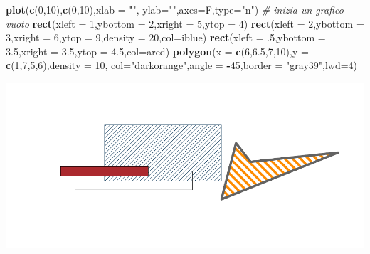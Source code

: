 \documentclass[
  11pt,
]{book}
\newenvironment{Shaded}{\begin{snugshade}}{\end{snugshade}}
\newcommand{\AttributeTok}[1]{\textcolor[rgb]{0.13,0.29,0.53}{#1}}
\newcommand{\CommentTok}[1]{\textcolor[rgb]{0.56,0.35,0.01}{\textit{#1}}}
\newcommand{\DecValTok}[1]{\textcolor[rgb]{0.00,0.00,0.81}{#1}}
\newcommand{\FloatTok}[1]{\textcolor[rgb]{0.00,0.00,0.81}{#1}}
\newcommand{\FunctionTok}[1]{\textcolor[rgb]{0.13,0.29,0.53}{\textbf{#1}}}
\newcommand{\NormalTok}[1]{#1}
\newcommand{\SpecialCharTok}[1]{\textcolor[rgb]{0.81,0.36,0.00}{\textbf{#1}}}
\newcommand{\StringTok}[1]{\textcolor[rgb]{0.31,0.60,0.02}{#1}}
\theoremstyle{mytheoremstyle}
\theoremstyle{mydefstyle}
\begin{document}
\begin{Shaded}
\begin{Highlighting}[]
\FunctionTok{plot}\NormalTok{(}\FunctionTok{c}\NormalTok{(}\DecValTok{0}\NormalTok{,}\DecValTok{10}\NormalTok{),}\FunctionTok{c}\NormalTok{(}\DecValTok{0}\NormalTok{,}\DecValTok{10}\NormalTok{),}\AttributeTok{xlab =} \StringTok{""}\NormalTok{, }\AttributeTok{ylab=}\StringTok{""}\NormalTok{,}\AttributeTok{axes=}\NormalTok{F,}\AttributeTok{type=}\StringTok{"n"}\NormalTok{) }\CommentTok{\# inizia un grafico vuoto }
\FunctionTok{rect}\NormalTok{(}\AttributeTok{xleft =} \DecValTok{1}\NormalTok{,}\AttributeTok{ybottom =} \DecValTok{2}\NormalTok{,}\AttributeTok{xright =} \DecValTok{5}\NormalTok{,}\AttributeTok{ytop =} \DecValTok{4}\NormalTok{)}
\FunctionTok{rect}\NormalTok{(}\AttributeTok{xleft =} \DecValTok{2}\NormalTok{,}\AttributeTok{ybottom =} \DecValTok{3}\NormalTok{,}\AttributeTok{xright =} \DecValTok{6}\NormalTok{,}\AttributeTok{ytop =} \DecValTok{9}\NormalTok{,}\AttributeTok{density =} \DecValTok{20}\NormalTok{,}\AttributeTok{col=}\NormalTok{iblue)}
\FunctionTok{rect}\NormalTok{(}\AttributeTok{xleft =}\NormalTok{ .}\DecValTok{5}\NormalTok{,}\AttributeTok{ybottom =} \FloatTok{3.5}\NormalTok{,}\AttributeTok{xright =} \FloatTok{3.5}\NormalTok{,}\AttributeTok{ytop =} \FloatTok{4.5}\NormalTok{,}\AttributeTok{col=}\NormalTok{ared)}
\FunctionTok{polygon}\NormalTok{(}\AttributeTok{x =} \FunctionTok{c}\NormalTok{(}\DecValTok{6}\NormalTok{,}\FloatTok{6.5}\NormalTok{,}\DecValTok{7}\NormalTok{,}\DecValTok{10}\NormalTok{),}\AttributeTok{y =} \FunctionTok{c}\NormalTok{(}\DecValTok{1}\NormalTok{,}\DecValTok{7}\NormalTok{,}\DecValTok{5}\NormalTok{,}\DecValTok{6}\NormalTok{),}\AttributeTok{density =} \DecValTok{10}\NormalTok{,}
        \AttributeTok{col=}\StringTok{"darkorange"}\NormalTok{,}\AttributeTok{angle =} \SpecialCharTok{{-}}\DecValTok{45}\NormalTok{,}\AttributeTok{border =} \StringTok{"gray39"}\NormalTok{,}\AttributeTok{lwd=}\DecValTok{4}\NormalTok{)}
\end{Highlighting}
\end{Shaded}

\begin{center}\includegraphics{Appunti_di_Statistica_2025_files/figure-latex/24-Libro-29-1} \end{center}
\end{document}
